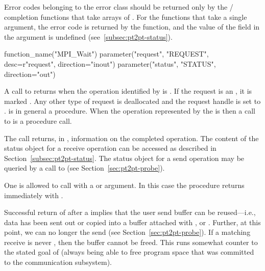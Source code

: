 Error codes belonging to the error class  should
be returned only by the \MPI/ completion functions that take arrays of
.
For the functions that take a single  argument, the
error code is returned by the function, and the value of the 
field in the  argument is undefined (see~\ref{subsec:pt2pt-status}).

\begin{mpi-binding}
    function_name("MPI_Wait")
    parameter("request", "REQUEST", desc=r"request", direction="inout")
    parameter("status", "STATUS", direction="out")
\end{mpi-binding}

A call to  returns when the operation
identified by  is .  If the request is an  ,
it is marked .  Any other type of request
is deallocated
and the request handle is set to .
 is in general a  procedure.
When the operation represented by the  is
then a call to  is a  procedure call.

The call returns, in , information on
the completed operation.  The content of the status object for a receive
operation can be accessed as
described in Section~\ref{subsec:pt2pt-status}.
The status object for a send operation may be queried by
a call to 
(see Section~\ref{sec:pt2pt-probe}).

One is allowed to call  with a  or 
 argument.
In this case the procedure returns immediately with  .

\begin{users}
Successful return of  after a  implies
that the user send buffer can be reused---i.e., data has been sent
out or copied into a
buffer attached with ,  or .
Further, at this point,
we can no longer  the send (see Section~\ref{sec:pt2pt-probe}).
If a matching receive is never
, then the buffer cannot be freed.  This runs somewhat
counter to the stated goal of  (always being able to free
program space that was committed to the communication subsystem).
\end{users}

